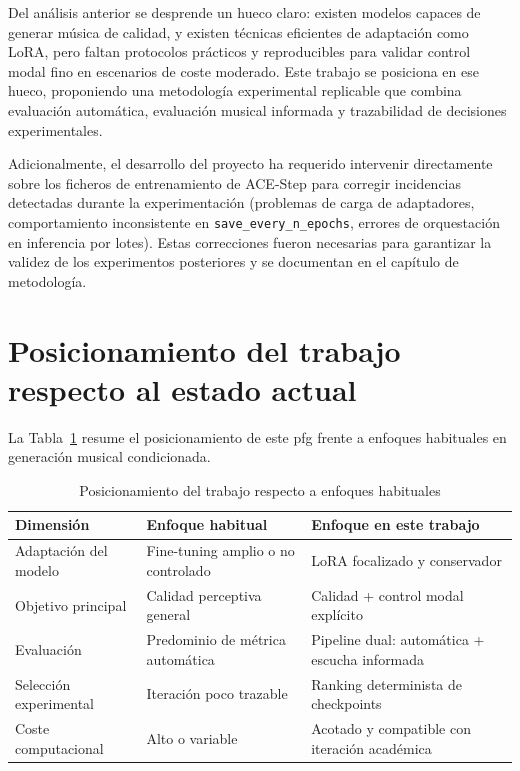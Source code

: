 \documentclass[%
    school=etsisi,%
    type=pfg,%
    degree=61CD,%
]{upm-report}
\begin{document}
Del an\'alisis anterior se desprende un hueco claro: existen modelos capaces de generar m\'usica de calidad, y existen t\'ecnicas eficientes de adaptaci\'on como LoRA, pero faltan protocolos pr\'acticos y reproducibles para validar control modal fino en escenarios de coste moderado. Este trabajo se posiciona en ese hueco, proponiendo una metodolog\'ia experimental replicable que combina evaluaci\'on autom\'atica, evaluaci\'on musical informada y trazabilidad de decisiones experimentales.

Adicionalmente, el desarrollo del proyecto ha requerido intervenir directamente sobre los ficheros de entrenamiento de ACE-Step para corregir incidencias detectadas durante la experimentaci\'on (problemas de carga de adaptadores, comportamiento inconsistente en \texttt{save\_every\_n\_epochs}, errores de orquestaci\'on en inferencia por lotes). Estas correcciones fueron necesarias para garantizar la validez de los experimentos posteriores y se documentan en el cap\'itulo de metodolog\'ia.

\section{Posicionamiento del trabajo respecto al estado actual}

La Tabla~\ref{tab:posicionamiento-trabajo} resume el posicionamiento de este \gls{pfg} frente a enfoques habituales en generaci\'on musical condicionada.

\begin{table}[H]
    \centering
    \caption{Posicionamiento del trabajo respecto a enfoques habituales}
    \label{tab:posicionamiento-trabajo}
    \begin{tabular}{lp{4.2cm}p{4.2cm}}
        \toprule
        \textbf{Dimensi\'on} & \textbf{Enfoque habitual} & \textbf{Enfoque en este trabajo} \\
        \midrule
        Adaptaci\'on del modelo & Fine-tuning amplio o no controlado & LoRA focalizado y conservador \\
        Objetivo principal & Calidad perceptiva general & Calidad + control modal expl\'icito \\
        Evaluaci\'on & Predominio de m\'etrica autom\'atica & Pipeline dual: autom\'atica + escucha informada \\
        Selecci\'on experimental & Iteraci\'on poco trazable & Ranking determinista de checkpoints \\
        Coste computacional & Alto o variable & Acotado y compatible con iteraci\'on acad\'emica \\
        \bottomrule
    \end{tabular}
\end{table}
\end{document}
